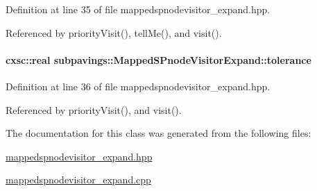 \-Definition at line 35 of file mappedspnodevisitor\-\_\-expand.\-hpp.



\-Referenced by priority\-Visit(), tell\-Me(), and visit().

\hypertarget{classsubpavings_1_1MappedSPnodeVisitorExpand_a77345ab08c67ee3b152e7f48795e1132}{
\paragraph[{tolerance}]{\setlength{\rightskip}{0pt plus 5cm}cxsc\-::real {\bf subpavings\-::\-Mapped\-S\-Pnode\-Visitor\-Expand\-::tolerance}}}\label{classsubpavings_1_1MappedSPnodeVisitorExpand_a77345ab08c67ee3b152e7f48795e1132}


\-Definition at line 36 of file mappedspnodevisitor\-\_\-expand.\-hpp.



\-Referenced by priority\-Visit(), and visit().



\-The documentation for this class was generated from the following files\-:\begin{DoxyCompactItemize}
\item 
\hyperlink{mappedspnodevisitor__expand_8hpp}{mappedspnodevisitor\-\_\-expand.\-hpp}\item 
\hyperlink{mappedspnodevisitor__expand_8cpp}{mappedspnodevisitor\-\_\-expand.\-cpp}\end{DoxyCompactItemize}

